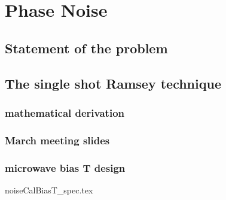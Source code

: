 \chapter{Phase Noise}

\section{Statement of the problem}

\section{The single shot Ramsey technique}

\subsection{mathematical derivation}

\subsection{March meeting slides}

\subsection{microwave bias T design}

{noiseCalBiasT_spec.tex}


